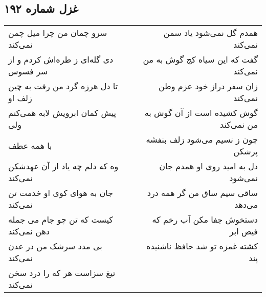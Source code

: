 \begin{center}
\section*{غزل شماره ۱۹۲}
\label{sec:sh192}
\begin{longtable}{l p{0.5cm} r}
سرو چمان من چرا میل چمن نمی‌کند
&&
همدم گل نمی‌شود یاد سمن نمی‌کند
\\
دی گله‌ای ز طره‌اش کردم و از سر فسوس
&&
گفت که این سیاه کج گوش به من نمی‌کند
\\
تا دل هرزه گرد من رفت به چین زلف او
&&
زان سفر دراز خود عزم وطن نمی‌کند
\\
پیش کمان ابرویش لابه همی‌کنم ولی
&&
گوش کشیده است از آن گوش به من نمی‌کند
\\
با همه عطف 
&&
چون ز نسیم می‌شود زلف بنفشه پرشکن
\\
وه که دلم چه یاد از آن عهدشکن نمی‌کند
&&
دل به امید روی او همدم جان نمی‌شود
\\
جان به هوای کوی او خدمت تن نمی‌کند
&&
ساقی سیم ساق من گر همه درد می‌دهد
\\
کیست که تن چو جام می جمله دهن نمی‌کند
&&
دستخوش جفا مکن آب رخم که فیض ابر
\\
بی مدد سرشک من در عدن نمی‌کند
&&
کشته غمزه تو شد حافظ ناشنیده پند
\\
تیغ سزاست هر که را درد سخن نمی‌کند
&&
\end{longtable}
\end{center}

